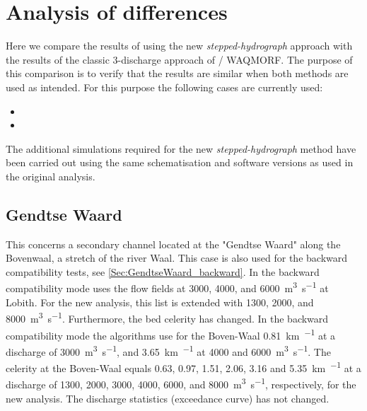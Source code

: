\chapter{Analysis of differences} \label{Chp:Verschil}

Here we compare the results of \dfastmi using the new \emph{stepped-hydrograph} approach with the results of the classic 3-discharge approach of  / WAQMORF.
The purpose of this comparison is to verify that the results are similar when both methods are used as intended.
For this purpose the following cases are currently used:

\begin{itemize}
\item {}
\item {}
\end{itemize}

The additional simulations required for the new \emph{stepped-hydrograph} method have been carried out using the same schematisation and software versions as used in the original analysis.



\section{Gendtse Waard}\label{Sec:GendtseWaard}
This concerns a secondary channel located at the "Gendtse Waard" along the Bovenwaal, a stretch of the river Waal.
This case is also used for the backward compatibility tests, see \autoref{Sec:GendtseWaard_backward}.
In the backward compatibility mode \dfmi uses the flow fields at 3000, 4000, and \SI{6000}{\metre\cubed\per\second} at Lobith.
For the new analysis, this list is extended with 1300, 2000, and \SI{8000}{\metre\cubed\per\second}.
Furthermore, the bed celerity has changed.
In the backward compatibility mode the algorithms use for the Boven-Waal \SI{0.81}{\kilo\metre\per\year} at a discharge of \SI{3000}{\metre\cubed\per\second}, and \SI{3.65}{\kilo\metre\per\year} at 4000 and \SI{6000}{\metre\cubed\per\second}.
The celerity at the Boven-Waal equals 0.63, 0.97, 1.51, 2.06, 3.16 and \SI{5.35}{\kilo\metre\per\year} at a discharge of 1300, 2000, 3000, 4000, 6000, and \SI{8000}{\metre\cubed\per\second}, respectively, for the new analysis.
The discharge statistics (exceedance curve) has not changed.

